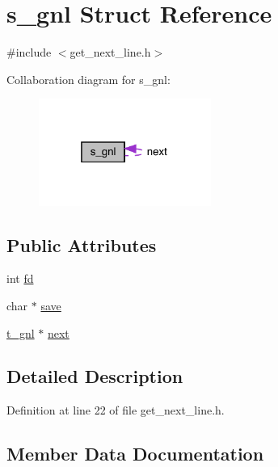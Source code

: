 \hypertarget{structs__gnl}{}\section{s\+\_\+gnl Struct Reference}
\label{structs__gnl}


{\ttfamily \#include $<$get\+\_\+next\+\_\+line.\+h$>$}



Collaboration diagram for s\+\_\+gnl\+:
\nopagebreak
\begin{figure}[H]
\begin{center}
\leavevmode
\includegraphics[width=160pt]{structs__gnl__coll__graph}
\end{center}
\end{figure}
\subsection*{Public Attributes}
\begin{DoxyCompactItemize}
\item 
int \hyperlink{structs__gnl_a5665b480d34c70c878292ca3e55ab29e}{fd}
\item 
char $\ast$ \hyperlink{structs__gnl_a44222278a024bbe4b391b746010444a4}{save}
\item 
\hyperlink{get__next__line_8h_ad253c7263891a8ba7b1fdf193cc58c59}{t\+\_\+gnl} $\ast$ \hyperlink{structs__gnl_ae99486a88491aaa37454a7f76ed99657}{next}
\end{DoxyCompactItemize}


\subsection{Detailed Description}


Definition at line 22 of file get\+\_\+next\+\_\+line.\+h.



\subsection{Member Data Documentation}
\mbox{\label{structs__gnl_a5665b480d34c70c878292ca3e55ab29e}} 
